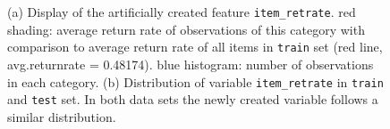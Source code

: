 \documentclass[a4paper,12pt]{article}
\begin{document}
\begin{figure}
	\caption{(a) Display of the artificially created feature \texttt{item\_retrate}. red shading: average return rate of observations of this category with comparison to average return rate of all items in \texttt{train} set (red line, avg.returnrate = 0.48174). blue histogram: number of observations in each category. (b) Distribution of variable \texttt{item\_retrate} in \texttt{train} and \texttt{test} set. In both data sets the newly created variable follows a similar distribution.}
	\label{Figure::ItemRetrate}
\end{figure}
\end{document}
